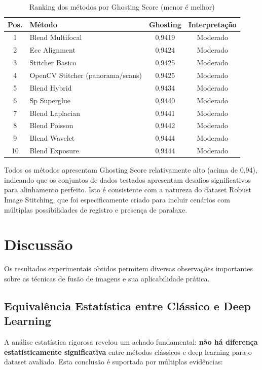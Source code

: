 \begin{table}[htb]
\centering
\caption{Ranking dos métodos por Ghosting Score (menor é melhor)}
\label{tab:ghosting-ranking}
\small
\begin{tabular}{clcc}
\hline
\textbf{Pos.} & \textbf{Método} & \textbf{Ghosting} & \textbf{Interpretação} \\ \hline
1 & Blend Multifocal & 0,9419 & Moderado \\
2 & Ecc Alignment & 0,9424 & Moderado \\
3 & Stitcher Basico & 0,9425 & Moderado \\
4 & OpenCV Stitcher (panorama/scans) & 0,9425 & Moderado \\
5 & Blend Hybrid & 0,9434 & Moderado \\
6 & Sp Superglue & 0,9440 & Moderado \\
7 & Blend Laplacian & 0,9441 & Moderado \\
8 & Blend Poisson & 0,9442 & Moderado \\
9 & Blend Wavelet & 0,9444 & Moderado \\
10 & Blend Exposure & 0,9444 & Moderado \\
\hline
\end{tabular}
\end{table}

Todos os métodos apresentam Ghosting Score relativamente alto (acima de 0,94), indicando que os conjuntos de dados testados apresentam desafios significativos para alinhamento perfeito. Isto é consistente com a natureza do dataset Robust Image Stitching, que foi especificamente criado para incluir cenários com múltiplas possibilidades de registro e presença de paralaxe.

\section{Discussão}

Os resultados experimentais obtidos permitem diversas observações importantes sobre as técnicas de fusão de imagens e sua aplicabilidade prática.

\subsection{Equivalência Estatística entre Clássico e Deep Learning}

A análise estatística rigorosa revelou um achado fundamental: \textbf{não há diferença estatisticamente significativa} entre métodos clássicos e deep learning para o dataset avaliado. Esta conclusão é suportada por múltiplas evidências:

